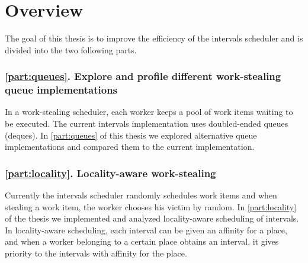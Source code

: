 \section{Overview}
\label{sec:intro-overview}

The goal of this thesis is to improve the efficiency of the intervals
scheduler and is divided into the two following parts.

\subsubsection{\autoref{part:queues}. Explore and profile different
  work-stealing queue implementations}

In a work-stealing scheduler, each worker keeps a pool of work items
waiting to be executed. The current intervals implementation uses
doubled-ended queues (deques). In \autoref{part:queues} of this thesis
we explored alternative queue implementations and compared them to the
current implementation.


\subsubsection{\autoref{part:locality}. Locality-aware work-stealing}

Currently the intervals scheduler randomly schedules work items and
when stealing a work item, the worker chooses his victim by random. In
\autoref{part:locality} of the thesis we implemented and analyzed
locality-aware scheduling of intervals. In locality-aware scheduling,
each interval can be given an affinity for a place, and when a worker
belonging to a certain place obtains an interval, it gives priority to
the intervals with affinity for the place.



